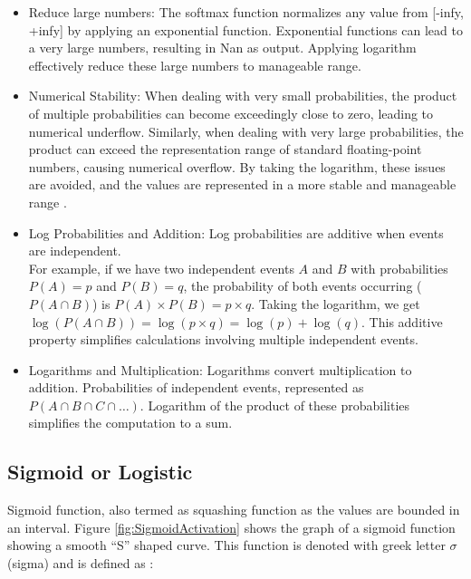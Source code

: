 \begin{itemize}
    \item Reduce large numbers:  The softmax function normalizes any value from [-infy, +infy] by applying an exponential function. Exponential functions can lead to a very large numbers, resulting in  Nan as output. Applying logarithm effectively reduce these large numbers to manageable range.
    \item Numerical Stability: When dealing with very small probabilities, the product of multiple probabilities can become exceedingly close to zero, leading to numerical underflow. Similarly, when dealing with very large probabilities, the product can exceed the representation range of standard floating-point numbers, causing numerical overflow. By taking the logarithm, these issues are avoided, and the values are represented in a more stable and manageable range \parencite[Page 79]{Goodfellow-et-al-2016}.
    
    \item Log Probabilities and Addition: Log probabilities are additive when events are independent.\\ For example, if we have two independent events \(A\) and \(B\) with probabilities \(P(A) = p\) and \(P(B) = q\), the probability of both events occurring (\(P(A \cap B)\)) is \(P(A) \times P(B) = p \times q\). Taking the logarithm, we get \(\log(P(A \cap B)) = \log(p \times q) = \log(p) + \log(q)\). This additive property simplifies calculations involving multiple independent events.

    \item Logarithms and Multiplication: Logarithms convert multiplication to addition. Probabilities of independent events,  represented as \(P(A \cap B \cap C \cap \ldots)\). Logarithm of the product of these probabilities simplifies the computation to a sum. 
\end{itemize}

\subsection{Sigmoid or Logistic}

Sigmoid function, also termed as squashing function as the values are bounded in an interval.  Figure \ref{fig:SigmoidActivation} shows the graph of a sigmoid function showing a smooth ``S'' shaped curve. This function is denoted with greek letter $\sigma$ (sigma) and is defined as \parencite[section 2.1]{Lederer.25012021}: 

